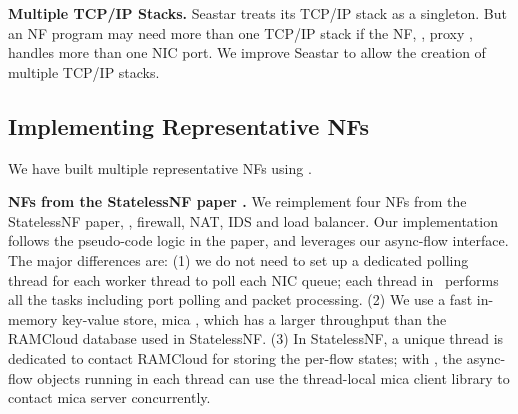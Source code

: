 

\noindent\textbf{Multiple TCP/IP Stacks.} Seastar treats its TCP/IP stack as a singleton. But an NF program may need more than one TCP/IP stack if the NF, \eg, proxy \cite{haproxy}, handles more than one NIC port.
We improve Seastar to allow the creation of multiple TCP/IP stacks.

\subsection{Implementing Representative NFs}
\label{NFs}

We have built multiple representative NFs using \netstar.

\noindent\textbf{NFs from the StatelessNF paper \cite{201545}.} We reimplement four NFs from the StatelessNF paper, \ie, firewall, NAT, IDS and load balancer. Our implementation follows the pseudo-code logic in the paper, and leverages our async-flow interface. The major differences are: (1) we do not need to set up a dedicated polling thread for each worker thread to poll each NIC queue; each thread in \netstar~performs all the tasks including port polling and packet processing. %
(2) %
We use a fast in-memory key-value store, mica \cite{179747}, which has a larger throughput than the RAMCloud database \cite{ousterhout2015ramcloud} used in StatelessNF. %
(3) In StatelessNF, a unique thread is dedicated to contact RAMCloud for storing the per-flow states; with \netstar, the async-flow objects running in each thread can use the thread-local mica client library to contact mica server concurrently.

